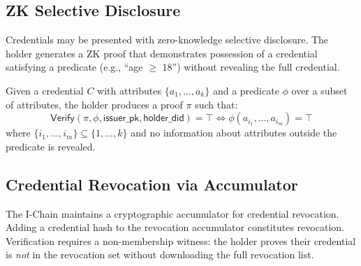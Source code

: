 \subsection{ZK Selective Disclosure}

Credentials may be presented with zero-knowledge selective disclosure. The holder
generates a ZK proof that demonstrates possession of a credential satisfying a
predicate (e.g., ``age $\geq$ 18'') without revealing the full credential.

\begin{definition}\label{def:zksd}
Given a credential $C$ with attributes $\{a_1, \ldots, a_k\}$ and a predicate
$\phi$ over a subset of attributes, the holder produces a proof $\pi$ such that:
\[
    \mathsf{Verify}(\pi, \phi, \mathsf{issuer\_pk}, \mathsf{holder\_did}) = \top
    \iff \phi(a_{i_1}, \ldots, a_{i_m}) = \top
\]
where $\{i_1, \ldots, i_m\} \subseteq \{1, \ldots, k\}$ and no information
about attributes outside the predicate is revealed.
\end{definition}

\subsection{Credential Revocation via Accumulator}

The I-Chain maintains a cryptographic accumulator for credential revocation.
Adding a credential hash to the revocation accumulator constitutes revocation.
Verification requires a non-membership witness: the holder proves their credential
is \emph{not} in the revocation set without downloading the full revocation list.

